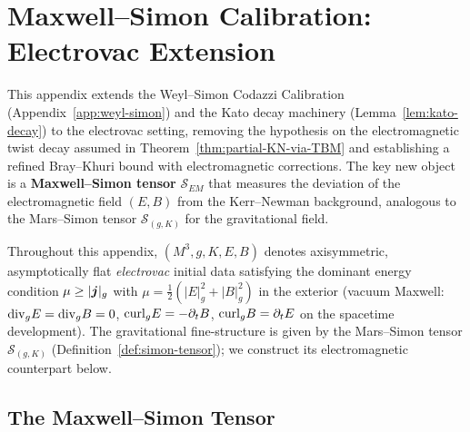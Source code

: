 \section{Maxwell--Simon Calibration: Electrovac Extension}\label{app:maxwell-simon}

This appendix extends the Weyl--Simon Codazzi Calibration (Appendix~\ref{app:weyl-simon}) and the Kato decay machinery (Lemma~\ref{lem:kato-decay}) to the electrovac setting, removing the hypothesis on the electromagnetic twist decay assumed in Theorem~\ref{thm:partial-KN-via-TBM} and establishing a refined Bray--Khuri bound with electromagnetic corrections. The key new object is a \textbf{Maxwell--Simon tensor} $\mathcal{S}_{EM}$ that measures the deviation of the electromagnetic field $(E, B)$ from the Kerr--Newman background, analogous to the Mars--Simon tensor $\mathcal{S}_{(g,K)}$ for the gravitational field.

Throughout this appendix, $(M^3, g, K, E, B)$ denotes axisymmetric, asymptotically flat \emph{electrovac} initial data satisfying the dominant energy condition $\mu \geq |\boldsymbol{j}|_g$ with $\mu = \tfrac{1}{2}(|E|^2_g + |B|^2_g)$ in the exterior (vacuum Maxwell: $\mathrm{div}_g E = \mathrm{div}_g B = 0$, $\mathrm{curl}_g E = -\partial_t B$, $\mathrm{curl}_g B = \partial_t E$ on the spacetime development). The gravitational fine-structure is given by the Mars--Simon tensor $\mathcal{S}_{(g,K)}$ (Definition~\ref{def:simon-tensor}); we construct its electromagnetic counterpart below.

\subsection{The Maxwell--Simon Tensor}

